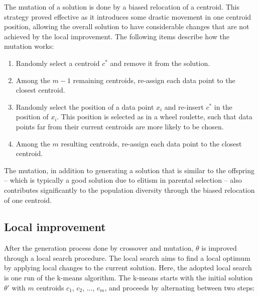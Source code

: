 The mutation of a solution is done by a biased relocation of a centroid. This strategy proved effective as it introduces some drastic movement in one centroid position, allowing the overall solution to have considerable changes that are not achieved by the local improvement. The following items describe how the mutation works:

\begin{enumerate}

	\item Randomly select a centroid $c^{*}$ and remove it from the solution.
	
	\item Among the $m-1$ remaining centroids, re-assign each data point to the closest centroid.
	
	\item Randomly select the position of a data point $x_i$ and re-insert $c^{*}$ in the position of $x_i$. This position is selected as in a wheel roulette, such that data points far from their current centroids are more likely to be chosen.
	
	\item Among the $m$ resulting centroids, re-assign each data point to the closest centroid.
		
\end{enumerate}

The mutation, in addition to generating a solution that is similar to the offspring -- which is typically a good solution due to elitism in parental selection -- also contributes significantly to the population diversity through the biased relocation of one centroid.

\subsection{Local improvement}
After the generation process done by crossover and mutation, $\theta$ is improved through a local search procedure. The local search aims to find a local optimum by applying local changes to the current solution. Here, the adopted local search is one run of the k-means algorithm. The k-means starts with the initial solution $\theta'$ with $m$ centroids $c_1$, $c_2$, ..., $c_m$, and proceeds by alternating between two steps:

